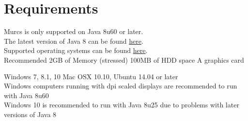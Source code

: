 \section{Requirements}

Murcs is only supported on Java 8u60 or later.\\
The latest version of Java 8 can be found  \href{http://www.oracle.com/technetwork/java/javase/downloads/index-jsp-138363.html}{here}.\\
Supported operating systems can be found
\href{http://www.oracle.com/technetwork/java/javase/certconfig-2095354.html}{here}.\\

Recommended
2GB of Memory (stressed)
100MB of HDD space
A graphics card

Windows 7, 8.1, 10 Mac OSX 10.10, Ubuntu 14.04 or later\\
Windows computers running with dpi scaled displays are recommended to run with Java 8u60\\
Windows 10 is recommended to run with Java 8u25 due to problems with later versions of Java 8

